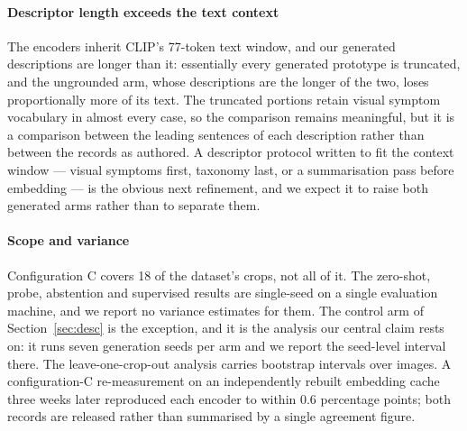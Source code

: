 \documentclass[a4paper,fleqn]{cas-dc}
\begin{document}
\paragraph{Descriptor length exceeds the text context} The encoders inherit CLIP's 77-token text
window, and our generated descriptions are longer than it: essentially every generated prototype is
truncated, and the ungrounded arm, whose descriptions are the longer of the two, loses proportionally
more of its text. The truncated portions retain visual symptom vocabulary in almost every case, so
the comparison remains meaningful, but it is a comparison between the leading sentences of each
description rather than between the records as authored. A descriptor protocol written to fit the
context window --- visual symptoms first, taxonomy last, or a summarisation pass before embedding ---
is the obvious next refinement, and we expect it to raise both generated arms rather than to
separate them.

\paragraph{Scope and variance} Configuration C covers 18 of the dataset's crops, not all of it. %
The zero-shot, probe, abstention and supervised results are
single-seed on a single evaluation machine, and we report no variance estimates for them.
The control arm of Section~\ref{sec:desc} is the exception, and it is the analysis our
central claim rests on: it runs seven generation seeds per arm and we report the seed-level
interval there. The leave-one-crop-out analysis carries bootstrap intervals over images. A
configuration-C re-measurement on an independently rebuilt embedding cache three weeks later
reproduced each encoder to within 0.6 percentage points; both records are released rather
than summarised by a single agreement figure.
\end{document}
